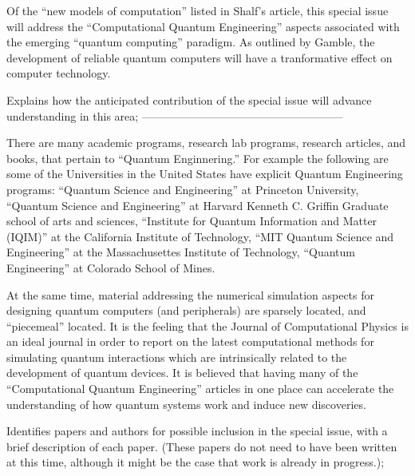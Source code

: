 \documentclass[]{article}
\begin{document}
Of the ``new models of computation'' listed in 
Shalf's article\cite{shalf2020future}, this special issue will address
the ``Computational Quantum Engineering'' aspects associated with the
emerging ``quantum computing'' paradigm.  As outlined by
Gamble\cite{gamble2019quantum}, the development of reliable quantum
computers will have a tranformative effect on computer technology.



Explains how the anticipated contribution of the special issue will advance understanding in this area;
------------------------------------------------------

There are many academic programs, research lab programs,
research articles, and books, that pertain to
``Quantum Enginnering.''  For example the following are some of the
Universities in the
United States have explicit Quantum Engineering programs: 
``Quantum Science and Engineering'' at Princeton University, 
``Quantum Science and Engineering'' at Harvard Kenneth C. Griffin Graduate
school of arts and sciences, 
``Institute for Quantum Information and Matter (IQIM)'' at the California 
Institute of Technology,
``MIT Quantum Science and Engineering'' at the Massachusettes Institute of 
Technology,
``Quantum Engineering'' at Colorado School of Mines.

At the same time, material addressing the numerical
simulation aspects for designing quantum computers (and peripherals) are
sparsely located, and ``piecemeal'' located.  It is the feeling that
the Journal of Computational Physics is an ideal journal in order to 
report on the latest computational methods for simulating quantum
interactions which are intrinsically related to the development of quantum
devices.  It is believed that having many of the ``Computational Quantum
Engineering'' articles in one place can accelerate the understanding of 
how quantum systems work and induce new discoveries.

Identifies papers and authors for possible inclusion in the special issue, with a brief description of each paper. (These papers do not need to have been written at this time, although it might be the case that work is already in progress.);
\end{document}
